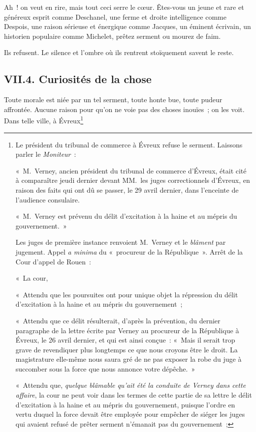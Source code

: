 \documentclass[french,twoside]{book} %
\begin{document}
Ah ! on veut en rire, mais tout ceci serre le cœur. Êtes-vous un jeune et rare et généreux esprit comme Deschanel, une ferme et droite intelligence comme Despois, une raison sérieuse et énergique comme Jacques, un éminent écrivain, un historien populaire comme Michelet, prêtez serment ou mourez de faim.\par
Ils refusent. Le silence et l’ombre où ils rentrent stoïquement savent le reste.
\subsection[{VII.4. Curiosités de la chose}]{VII.4. Curiosités de la chose}
\noindent Toute morale est niée par un tel serment, toute honte bue, toute pudeur affrontée. Aucune raison pour qu’on ne voie pas des choses inouïes ; on les voit. Dans telle ville, à Évreux\footnote{ \noindent Le président du tribunal de commerce à Évreux refuse le serment. Laissons parler le \emph{Moniteur} :\par
 « M. Verney, ancien président du tribunal de commerce d’Évreux, était cité à comparaître jeudi dernier devant MM. les juges correctionnels d’Évreux, en raison des faits qui ont dû se passer, le 29 avril dernier, dans l’enceinte de l’audience consulaire.\par
 « M. Verney est prévenu du délit d’excitation à la haine et au mépris du gouvernement. »\par
 Les juges de première instance renvoient M. Verney et le \emph{blâment} par jugement. Appel \emph{a minima} du « procureur de la République ». Arrêt de la Cour d’appel de Rouen :\par
 « La cour,\par
 « Attendu que les poursuites ont pour unique objet la répression du délit d’excitation à la haine et au mépris du gouvernement ;\par
 « Attendu que ce délit résulterait, d’après la prévention, du dernier paragraphe de la lettre écrite par Verney au procureur de la République à Évreux, le 26 avril dernier, et qui est ainsi conçue : « Mais il serait trop grave de revendiquer plus longtemps ce que nous croyons être le droit. La magistrature elle-même nous saura gré de ne pas exposer la robe du juge à succomber sous la force que nous annonce votre dépêche. »\par
 « Attendu que, \emph{quelque blâmable qu’ait été la conduite de Verney dans cette affaire}, la cour ne peut voir dans les termes de cette partie de sa lettre le délit d’excitation à la haine et au mépris du gouvernement, puisque l’ordre en vertu duquel la force devait être employée pour empêcher de siéger les juges qui avaient refusé de prêter serment n’émanait pas du gouvernement ;\par
}
\end{document}
